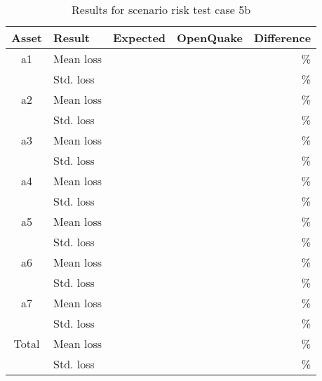 \begin{table}[htbp]

\centering
\begin{tabular}{ c l r r r }

\hline
\rowcolor{anti-flashwhite}
\bf{Asset} & \bf{Result} & \bf{Expected} & \bf{OpenQuake} & \bf{Difference}\\
\hline
a1 & Mean loss &  &  & \% \\
 & Std. loss &  &  & \% \\
\hline
a2 & Mean loss &  &  & \% \\
 & Std. loss &  &  & \% \\
\hline
a3 & Mean loss &  &  & \% \\
 & Std. loss &  &  & \% \\
\hline
a4 & Mean loss &  &  & \% \\
 & Std. loss &  &  & \% \\
\hline
a5 & Mean loss &  &  & \% \\
 & Std. loss &  &  & \% \\
\hline
a6 & Mean loss &  &  & \% \\
 & Std. loss &  &  & \% \\
\hline
a7 & Mean loss &  &  & \% \\
 & Std. loss &  &  & \% \\
\hline
Total & Mean loss &  &  & \% \\
 & Std. loss &  &  & \% \\
\hline
\end{tabular}

\caption{Results for scenario risk test case 5b}
\label{tab:result-scenario-risk-5b}
\end{table}
